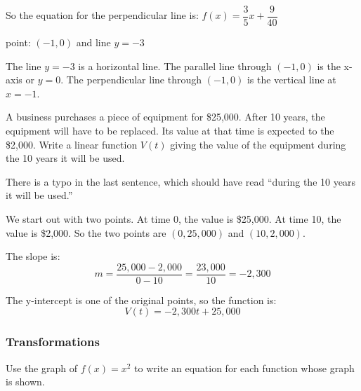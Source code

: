 \documentclass[fleqn,addpoints]{exam}
\begin{document}
\begin{questions}
\begin{solution}[1cm]
So the equation for the perpendicular line is: $f(x) = \dfrac{3}{5}x + \dfrac{9}{40}$

\end{solution}

\question
\label{si:last}
point: $(-1, 0)$ and line $y = -3$

\begin{solution}
The line $y = -3$ is a horizontal line.  The parallel line through $(-1, 0)$ is the x-axis or $y = 0$.  The
perpendicular line through $(-1, 0)$ is the vertical line at $x = -1$.
\end{solution}

\question 
A business purchases a piece of equipment for \$25,000.  After 10 years, the equipment will have to be replaced.  Its
value at that time is expected to the \$2,000.  Write a linear function $V(t)$ giving the value of the equipment during
the 10 years it will be used.

\begin{solution}

There is a typo in the last sentence, which should have read ``during the 10 years it will be used.''

We start out with two points.  At time 0, the value is \$25,000.  At time 10, the value is \$2,000.  So the two points
are $(0, 25,000)$ and $(10, 2,000)$.

The slope is:
\[
  m = \frac{25,000 - 2,000}{0 - 10} = \frac{23,000}{10} = -2,300
\]

The y-intercept is one of the original points, so the function is:
\[
   V(t) = -2,300t + 25,000
\]

\end{solution}


\subsubsection{Transformations}

\question
Use the graph of $f(x) = x^2$ to write an equation for each function whose graph is shown.
\end{questions}
\end{document}
